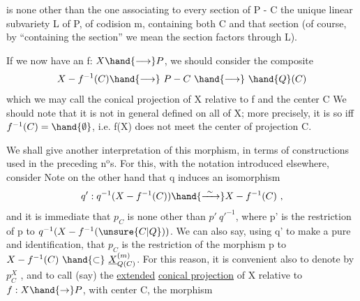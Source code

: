 
is none other than the one associating to every section of P - C the unique
linear subvariety L of P, of codision m, containing both C
and that section (of course, by “containing the section” we mean 
the section factors through L).

If we now have an f: $X \hand{\longrightarrow} P$, we should consider the
composite
\[ X - f^{-1}(C) \hand{\longrightarrow}\ P - C \ \hand{\longrightarrow}\ \hand{Q}(C) \]
which we may call the conical projection of X relative to f and the center
C\hand{,}  We should note that it is not in general defined on all of X;
more precisely, it is so iff $f^{-1}(C)=\hand{\emptyset}$, i.e. f(X) does not meet
the center of projection C. \hand{\unsure{/|)}}

We shall give another interpretation of this morphism, in
terms of constructions used in the preceding n$^{\text{o}}$s. For this,
with the notation introduced elsewhere, consider
\diagram{\[
\begin{array}{ccc}
X & \overset{q}{\hand{\longleftarrow}} & \underline{X}^{(m)}_{\unsure{Q|G}(C)} = \underline{X}^{(m)}x_{\mathrm{Grass}^{m}}\hand{Q}(C) \\
 & & p\var{\xout{\unsure{z}}}{}{typewriter strike-out}{ega25_25_085-v0004}\quad\hand{\downarrow} \\
 & & \hand{Q}(C) \quad .
\end{array}
\]}
Note on the other hand that q induces an isomorphism
\[ q':q^{-1}(X-f^{-1}(C)) \hand{\xrightarrow{\ \sim\ }} X - f^{-1}(C) \ , \]
and it is immediate that $p_{C}$ is none other than $p'\ q'^{-1}$, where p' is the
restriction of p to $q^{-1}(X-f^{-1}(\unsure{C|Q}))$. We can also say, using q'
to make a pure and  identification, that $p_{C}$ is the restriction
of the morphism p to $X - f^{-1}(C) \ \hand{\subset}\ \underline{X}^{(m)}_{Q(C)}$. For this reason, it is
convenient also to denote by $p^{X}_{C}$ , and to call (say) the \uline{extended}
\uline{conical projection} of X\hand{,} relative to $f:X\hand{\rightarrow} P$, with center C, the morphism


